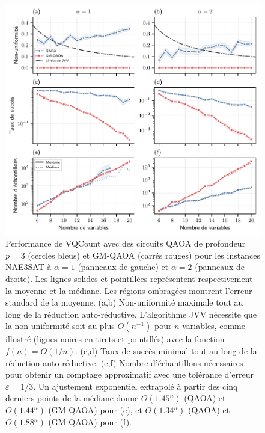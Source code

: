 \begin{figure}[H]
    \centering
    \includegraphics[width=1\textwidth]{figures/nae3sat-nonuniformity.pdf}
    \caption[Biais d'échantillonnage de \#NAE3SAT]{Performance de VQCount avec des circuits QAOA de profondeur $p=3$ (cercles bleus) et GM-QAOA (carrés rouges) pour les instances NAE3SAT à $\alpha=1$ (panneaux de gauche) et $\alpha=2$ (panneaux de droite). Les lignes solides et pointillées représentent respectivement la moyenne et la médiane. Les régions ombragées montrent l'erreur standard de la moyenne. (a,b) Non-uniformité maximale tout au long de la réduction auto-réductive. L'algorithme JVV nécessite que la non-uniformité soit au plus $O(n^{-1})$ pour $n$ variables, comme illustré (lignes noires en tirets et pointillés) avec la fonction $f(n) = O(1/n)$. (c,d) Taux de succès minimal tout au long de la réduction auto-réductive. (e,f) Nombre d'échantillons nécessaires pour obtenir un comptage approximatif avec une tolérance d'erreur $\varepsilon = 1/3$. Un ajustement exponentiel extrapolé à partir des cinq derniers points de la médiane donne $O(1.45^n)$ (QAOA) et $O(1.44^n)$ (GM-QAOA) pour (e), et $O(1.34^n)$ (QAOA) et $O(1.88^n)$ (GM-QAOA) pour (f).}
    \label{fig:nae3sat-number-of-samples}
\end{figure}

